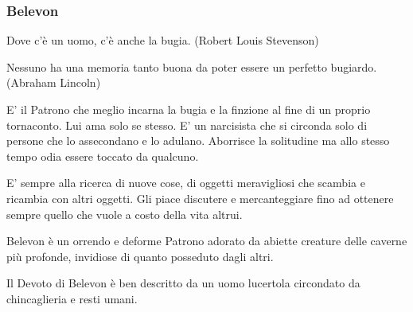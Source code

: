 \begin{multicols}{2}
\subsubsection{Belevon}\label{belevon}\hypertarget{belevon}{}

\begin{changemargin}{0.3cm}{0.3cm}\begin{enfasi}{
Dove c'è un uomo, c'è anche la bugia. (Robert Louis Stevenson)

\medskip

Nessuno ha una memoria tanto buona da poter essere un perfetto bugiardo. (Abraham Lincoln)
}\end{enfasi}\end{changemargin}\medskip

E' il Patrono che meglio incarna la bugia e la finzione al fine di un proprio tornaconto. Lui ama solo se stesso. E' un narcisista che si circonda solo di persone che lo assecondano e lo adulano. Aborrisce la solitudine ma allo stesso tempo odia essere toccato da qualcuno.

E' sempre alla ricerca di nuove cose, di oggetti meravigliosi che scambia e ricambia con altri oggetti. Gli piace discutere e mercanteggiare fino ad ottenere sempre quello che vuole a costo della vita altrui.

Belevon è un orrendo e deforme Patrono adorato da abiette creature delle caverne più profonde, invidiose di quanto posseduto dagli altri.

Il Devoto di Belevon è ben descritto da un uomo lucertola circondato da chincaglieria e resti umani.


\end{multicols}

